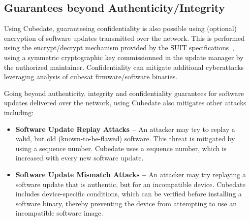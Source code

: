 \subsection{Guarantees beyond Authenticity/Integrity}

Using Cubedate, guaranteeing confidentiality is also possible using (optional) encryption of software updates transmitted over the network.
This is performed using the encrypt/decrypt mechanism provided by the SUIT specifications~\cite{suit-firmware-encryption}, using a symmetric cryptographic key commissionned in the update manager by the authorized maintainer. 
Confidentiality can mitigate additional cyberattacks leveraging analysis of cubesat firmware/software binaries.

Going beyond authenticity, integrity and confidentiality guarantees for software updates delivered over the network, using Cubedate also mitigates other attacks including:
\begin{itemize}
\item {\bf Software Update Replay Attacks –} An attacker may try to replay a valid, but old (known-to-be-flawed) software. This threat is mitigated by using a sequence number. Cubedate uses a sequence number, which is increased with every new software update.

\item {\bf Software Update Mismatch Attacks –} An attacker may try replaying a software update that is authentic, but for an incompatible device. Cubedate includes device-specific conditions, which can be verified before installing a software binary, thereby preventing the device from attempting to use an incompatible software image.
\end{itemize}
